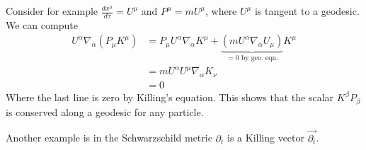 \documentclass[10pt]{article}
\begin{document}
   
   Consider for example $\frac{dx^\mu}{d\tau} = U^\mu$ and $P^\mu = m U^\mu$, where $U^\mu$ is tangent to a geodesic. We can compute 
   \begin{align}
   U^\alpha \nabla_ \alpha \left(P_\mu K^\mu\right) &=  P_\mu U^\alpha \nabla_\alpha K^\mu+ \underbrace{\left( m U^\alpha \nabla_\alpha U_\mu\right)}_{=0 \text{ by geo. eqn.}} K^\mu \\ 
   &= m U^\alpha U^\mu \nabla_\alpha K_\nu \\&= 0
   \end{align}
   Where the last line is zero by Killing's equation. This shows that the scalar $K^\beta P_\beta$ is conserved along a geodesic for any particle.
   
   Another example is in the Schwarzschild metric $\partial_t$ is a Killing vector $\vec{\partial_t}$. 

\end{document}

